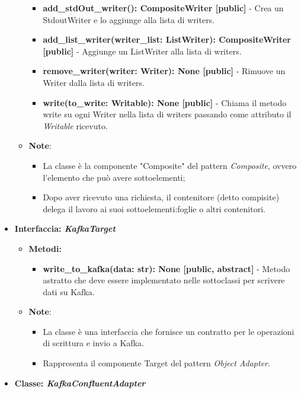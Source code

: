 \begin{itemize}
\begin{itemize}
\begin{itemize}
        \item \textbf{add\_stdOut\_writer(): CompositeWriter [public]} - Crea un StdoutWriter e lo aggiunge alla lista di writers.
        \item \textbf{add\_list\_writer(writer\_list: ListWriter): CompositeWriter [public]} - Aggiunge un ListWriter alla lista di writers.
        \item \textbf{remove\_writer(writer: Writer): None [public]} - Rimuove un Writer dalla lista di writers.
        \item \textbf{write(to\_write: Writable): None [public]} - Chiama il metodo write su ogni Writer nella lista di writers passando come attributo il \textit{Writable} ricevuto.
    \end{itemize}
    \item\textbf{Note}:
        \begin{itemize}
            \item La classe è la componente "Composite" del pattern \textit{Composite}, ovvero l'elemento che può avere sottoelementi;
            \item Dopo aver ricevuto una richiesta, il contenitore (detto compisite) delega il lavoro ai suoi sottoelementi:foglie o altri contenitori.
        \end{itemize}
    \end{itemize}
    \item{\textbf{Interfaccia: \textit{KafkaTarget}}}
    \begin{itemize}
    \item \textbf{Metodi: }
    \begin{itemize}
        \item \textbf{write\_to\_kafka(data: str): None [public, abstract]} - Metodo astratto che deve essere implementato nelle sottoclassi per scrivere dati su Kafka.
    \end{itemize}
    \item\textbf{Note}:
        \begin{itemize}
            \item La classe è una interfaccia che fornisce un contratto per le operazioni di scrittura e invio a Kafka.
            \item Rappresenta il componente Target del pattern \textit{Object Adapter}.
        \end{itemize}
    \end{itemize}
    \item{\textbf{Classe: \textit{KafkaConfluentAdapter}}}
    \begin{itemize}

\end{itemize}
\end{itemize}
